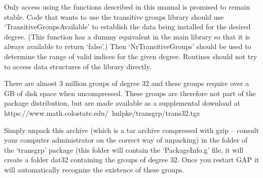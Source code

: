 
Only access using the functions described in this manual is promised to
remain stable. Code that wants to use the transitive groups library should
use `TransitiveGroupsAvailable' to establish the data being installed for
the desired degree. (This function has a dummy equivalent in the main {\GAP}
library so that it is always available to return `false'.) Then
`NrTransitiveGroups' should be used to determine the range of valid indices for
the given degree. Routines should not try to access data structures of the
library directly.


There are almost 3 million groups of degree 32 and these groups require over
a GB of disk space when uncompressed.
These groups are therefore not part of the package
distribution, but are made available as a supplemental download at 
\begintt
https://www.math.colostate.edu/~hulpke/transgrp/trans32.tgz
\endtt

Simply unpack this archive (which is a tar archive compressed with gzip --
consult your computer administrator on the correct way of unpacking)
in the folder of the `transgrp' package (this
folder will contain the `PackageInfo.g' file, it will create a folder dat32
containing the groups of degree 32. Once you restart GAP it will
automatically recognize the existence of these groups.
